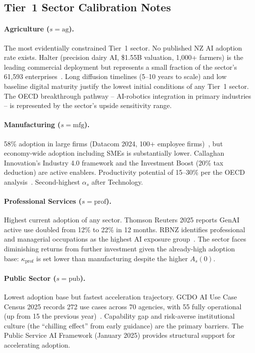 \documentclass[11pt,a4paper]{article}
\begin{document}
\subsection{Tier~1 Sector Calibration Notes}

\paragraph{Agriculture ($s = \text{ag}$).} The most evidentially constrained Tier~1 sector. No published NZ AI adoption rate exists. Halter (precision dairy AI, \$1.55B valuation, 1,000+ farmers) is the leading commercial deployment but represents a small fraction of the sector's 61,593 enterprises~\cite{statsnz2025}. Long diffusion timelines (5--10 years to scale) and low baseline digital maturity justify the lowest initial conditions of any Tier~1 sector. The OECD breakthrough pathway -- AI-robotics integration in primary industries -- is represented by the sector's upside sensitivity range.

\paragraph{Manufacturing ($s = \text{mfg}$).} 58\% adoption in large firms (Datacom 2024, 100+ employee firms)~\cite{datacom2024}, but economy-wide adoption including SMEs is substantially lower. Callaghan Innovation's Industry 4.0 framework and the Investment Boost (20\% tax deduction) are active enablers. Productivity potential of 15--30\% per the OECD analysis~\cite{oecd2024}. Second-highest $\alpha_s$ after Technology.

\paragraph{Professional Services ($s = \text{prof}$).} Highest current adoption of any sector. Thomson Reuters 2025 reports GenAI active use doubled from 12\% to 22\% in 12 months. RBNZ identifies professional and managerial occupations as the highest AI exposure group~\cite{rbnz2025}. The sector faces diminishing returns from further investment given the already-high adoption base: $\kappa_{\text{prof}}$ is set lower than manufacturing despite the higher $A_s(0)$.

\paragraph{Public Sector ($s = \text{pub}$).} Lowest adoption base but fastest acceleration trajectory. GCDO AI Use Case Census 2025 records 272 use cases across 70 agencies, with 55 fully operational (up from 15 the previous year)~\cite{aiforum2024}. Capability gap and risk-averse institutional culture (the ``chilling effect'' from early guidance) are the primary barriers. The Public Service AI Framework (January 2025) provides structural support for accelerating adoption.
\end{document}
